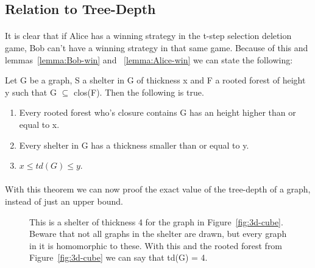 \subsection{Relation to Tree-Depth}

\paragraph{}
It is clear that if Alice has a winning strategy in the t-step selection deletion game, Bob can't have a winning strategy in that same game. Because of this and lemmas~\ref{lemma:Bob-win} and ~\ref{lemma:Alice-win} we can state the following:
\begin{theorem}
Let G be a graph, S a shelter in G of thickness x and F a rooted forest of height y such that G $\subseteq$ clos(F). Then the following is true.
\begin{enumerate}
\item Every rooted forest who's closure contains G has an height higher than or equal to x.
\item Every shelter in G has a thickness smaller than or equal to y.
\item $x \leq td(G) \leq y$.
\end{enumerate}
\end{theorem}

\paragraph{}
With this theorem we can now proof the exact value of the tree-depth of a graph, instead of just an upper bound.

\begin{figure}[H]

\caption{This is a shelter of thickness 4 for the graph in Figure~\ref{fig:3d-cube}. Beware that not all graphs in the shelter are drawn, but every graph in it is homomorphic to these. With this and the rooted forest from Figure~\ref{fig:3d-cube} we can say that td(G) = 4. 
\label{fig:3d-cube-shelter}}
\end{figure}